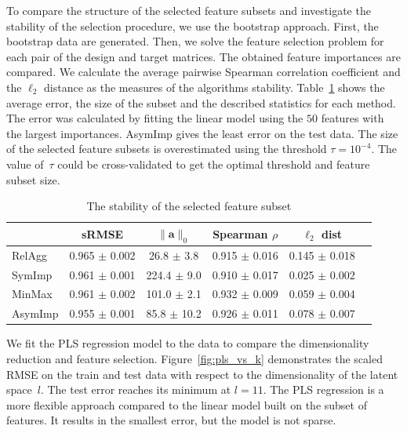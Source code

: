 \documentclass[12pt,twoside]{article}
\theoremstyle{definition}
\newcommand{\ba}{\mathbf{a}}
\begin{document}
To compare the structure of the selected feature subsets and investigate the stability of the selection procedure, we use the bootstrap approach. 
First, the bootstrap data are generated. 
Then, we solve the feature selection problem for each pair of the design and target matrices.
The obtained feature importances are compared. 
We calculate the average pairwise Spearman correlation coefficient and the $\ell_2$ distance as the measures of the algorithms stability.
Table~\ref{tbl:stability} shows the average error, the size of the subset and the described statistics for each method. The error was calculated by fitting the linear model using the $50$ features with the largest importances.
AsymImp gives the least error on the test data. 
The size of the selected feature subsets is overestimated using the threshold $\tau=10^{-4}$. 
The value of~$\tau$ could be cross-validated to get the optimal threshold and feature subset size. 

\begin{table}[]
	\caption{The stability of the selected feature subset}
	\centering
	\begin{tabular}{l|ccccc}
		\hline
		& sRMSE  & $\|\ba\|_0$ & Spearman $\rho$ & $\ell_2$ dist \\ \hline
		RelAgg & 0.965 $\pm$ 0.002 & 26.8 $\pm$ 3.8 & 0.915 $\pm$ 0.016 & 0.145 $\pm$ 0.018   \\
		SymImp & 0.961 $\pm$ 0.001 & 224.4 $\pm$ 9.0 & 0.910 $\pm$ 0.017 & 0.025 $\pm$ 0.002   \\
		MinMax & 0.961 $\pm$ 0.002 & 101.0 $\pm$ 2.1& 0.932 $\pm$ 0.009 & 0.059 $\pm$ 0.004   \\
		AsymImp & 0.955 $\pm$ 0.001 & 85.8 $\pm$ 10.2& 0.926 $\pm$ 0.011 & 0.078 $\pm$ 0.007  \\ \hline
	\end{tabular}
	\label{tbl:stability}
\end{table}

We fit the PLS regression model to the data to compare the dimensionality reduction and feature selection. 
Figure~\ref{fig:pls_vs_k} demonstrates the scaled RMSE on the train and test data with respect to the dimensionality of the latent space~$l$.
The test error reaches its minimum at $l = 11$.
The PLS regression is a more flexible approach compared to the linear model built on the subset of features.
It results in the smallest error, but the model is not sparse.
\end{document}
